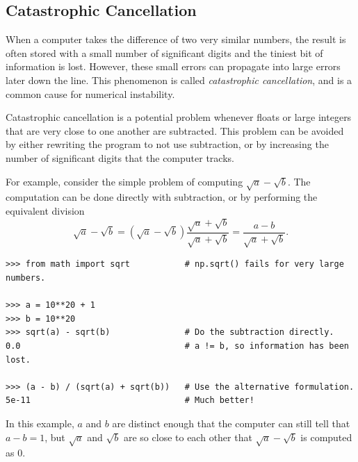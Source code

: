 \subsection*{Catastrophic Cancellation} %

When a computer takes the difference of two very similar numbers, the result is often stored with a small number of significant digits and the tiniest bit of information is lost.
However, these small errors can propagate into large errors later down the line.
This phenomenon is called \emph{catastrophic cancellation}, and is a common cause for numerical instability.

Catastrophic cancellation is a potential problem whenever floats or large integers that are very close to one another are subtracted.
This problem can be avoided by either rewriting the program to not use subtraction, or by increasing the number of significant digits that the computer tracks.

For example, consider the simple problem of computing $\sqrt{a}-\sqrt{b}$.
The computation can be done directly with subtraction, or by performing the equivalent division
\[
\sqrt{a}-\sqrt{b} = (\sqrt{a}-\sqrt{b})\frac{\sqrt{a}+\sqrt{b}}{\sqrt{a}+\sqrt{b}} = \frac{a-b}{\sqrt{a}+\sqrt{b}}.
\]

\begin{lstlisting}
>>> from math import sqrt           # np.sqrt() fails for very large numbers.

>>> a = 10**20 + 1
>>> b = 10**20
>>> sqrt(a) - sqrt(b)               # Do the subtraction directly.
0.0                                 # a != b, so information has been lost.

>>> (a - b) / (sqrt(a) + sqrt(b))   # Use the alternative formulation.
5e-11                               # Much better!
\end{lstlisting}

In this example, $a$ and $b$ are distinct enough that the computer can still tell that $a - b = 1$, but $\sqrt{a}$ and $\sqrt{b}$ are so close to each other that $\sqrt{a} - \sqrt{b}$ is computed as $0$.

